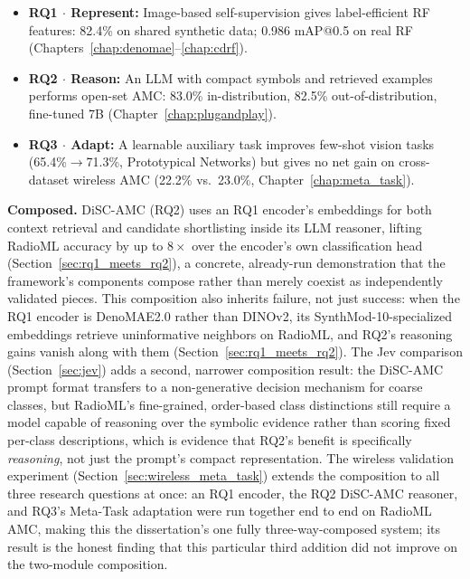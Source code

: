 \begin{itemize}
    \item \textbf{RQ1 $\cdot$ Represent:} Image-based self-supervision gives label-efficient RF features: 82.4\% on shared synthetic data; 0.986 mAP@0.5 on real RF (Chapters~\ref{chap:denomae}--\ref{chap:cdrf}).
    \item \textbf{RQ2 $\cdot$ Reason:} An LLM with compact symbols and retrieved examples performs open-set AMC: 83.0\% in-distribution, 82.5\% out-of-distribution, fine-tuned 7B (Chapter~\ref{chap:plugandplay}).
    \item \textbf{RQ3 $\cdot$ Adapt:} A learnable auxiliary task improves few-shot vision tasks (65.4\%$\to$71.3\%, Prototypical Networks) but gives no net gain on cross-dataset wireless AMC (22.2\% vs.\ 23.0\%, Chapter~\ref{chap:meta_task}).
\end{itemize}

\textbf{Composed.} DiSC-AMC (RQ2) uses an RQ1 encoder's embeddings for both context retrieval and candidate shortlisting inside its LLM reasoner, lifting RadioML accuracy by up to $8\times$ over the encoder's own classification head (Section~\ref{sec:rq1_meets_rq2}), a concrete, already-run demonstration that the framework's components compose rather than merely coexist as independently validated pieces. This composition also inherits failure, not just success: when the RQ1 encoder is DenoMAE2.0 rather than DINOv2, its SynthMod-10-specialized embeddings retrieve uninformative neighbors on RadioML, and RQ2's reasoning gains vanish along with them (Section~\ref{sec:rq1_meets_rq2}). The Jev comparison (Section~\ref{sec:jev}) adds a second, narrower composition result: the DiSC-AMC prompt format transfers to a non-generative decision mechanism for coarse classes, but RadioML's fine-grained, order-based class distinctions still require a model capable of reasoning over the symbolic evidence rather than scoring fixed per-class descriptions, which is evidence that RQ2's benefit is specifically \emph{reasoning}, not just the prompt's compact representation. The wireless validation experiment (Section~\ref{sec:wireless_meta_task}) extends the composition to all three research questions at once: an RQ1 encoder, the RQ2 DiSC-AMC reasoner, and RQ3's Meta-Task adaptation were run together end to end on RadioML AMC, making this the dissertation's one fully three-way-composed system; its result is the honest finding that this particular third addition did not improve on the two-module composition.


